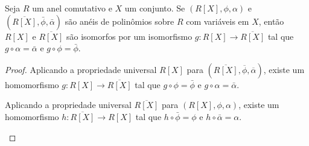\begin{prop}\label{prop:polinomio_universalUnicidade}
Seja $R$ um anel comutativo e $X$ um conjunto. Se $(R[X], \phi, \alpha)$ e $(\overline{R[X]}, \bar \phi, \bar \alpha)$ são anéis de polinômios sobre $R$ com variáveis em $X$, então $R[X]$ e $\overline{R[X]}$ são isomorfos por um isomorfismo $g:R[X]\rightarrow \overline{R[X]}$ tal que $g\circ \alpha=\bar \alpha$ e $g\circ \phi=\bar \phi$.
\end{prop}
\begin{proof}
    Aplicando a propriedade universal $R[X]$ para $(\overline{R[X]}, \overline \phi, \overline \alpha)$, existe um homomorfismo $g:R[X]\rightarrow \overline{R[X]}$ tal que $g\circ \phi=\bar \phi$ e $g\circ \alpha=\bar \alpha$.

    \begin{figure}[H]
        \centering
    \end{figure}
    Aplicando a propriedade universal $\overline{R[X]}$ para $(R[X], \phi, \alpha)$, existe um homomorfismo $h:\overline{R[X]}\rightarrow R[X]$ tal que $h\circ\bar \phi=\phi$ e $h\circ \bar\alpha=\alpha$.
    \begin{figure}[H]
        \centering
    \end{figure}


\end{proof}
